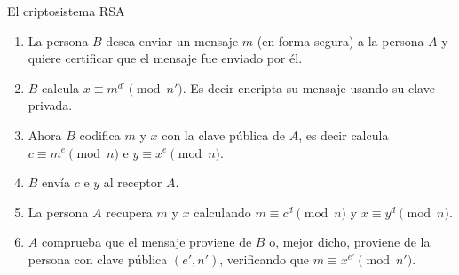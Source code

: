 \begin{section}{El criptosistema RSA}
\begin{ejemplo*}
\begin{enumerate}[label=\textit{\alph*)}]
    \item  La persona $B$ desea enviar un mensaje $m$ (en forma segura) a la persona $A$ y quiere certificar que el mensaje fue enviado por él.
    \item  $B$ calcula $x \equiv m^{d'} \pmod{n'}$. Es decir encripta su mensaje usando su  clave privada.
    \item  Ahora $B$ codifica $m$ y $x$ con la clave pública de $A$, es decir calcula $c \equiv m^{e} \pmod{n}$ e  $y \equiv x^e \pmod{n}$. 
    \item  $B$ envía $c$ e $y$ al receptor $A$.
    \item  La persona $A$ recupera $m$ y $x$ calculando  $m \equiv c^d \pmod{n}$ y  $x \equiv y^d \pmod{n}$.
    \item  $A$ comprueba que el mensaje  proviene de $B$ o, mejor dicho, proviene de la persona con clave pública $(e',n')$, verificando que $m \equiv x^{e'} \pmod{n'}$. 
\end{enumerate}
\end{ejemplo*}

\end{section}

